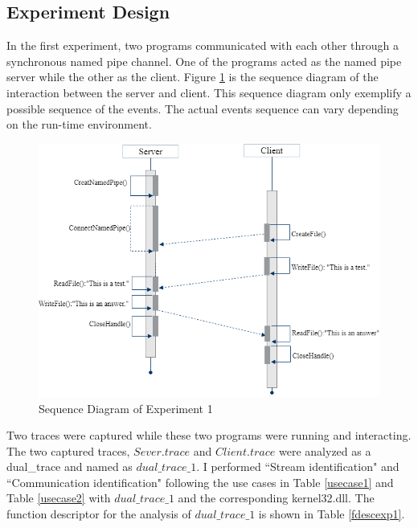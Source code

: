 \subsection{Experiment Design}
In the first experiment, two programs communicated with each other through a synchronous named pipe channel. One of the programs acted as the named pipe server while the other as the client. Figure \ref{exp1} is the sequence diagram of the interaction between the server and client. This sequence diagram only exemplify a possible sequence of the events. The actual events sequence can vary depending on the run-time environment. 


\begin{figure}[H]
\centerline{\includegraphics[scale=0.6]{Figures/exp1}}
 \caption{Sequence Diagram of Experiment 1}
\label{exp1}
\end{figure}

Two traces were captured while these two programs were running and interacting. The two captured traces, $Sever.trace$ and $Client.trace$ were analyzed as a dual\_trace and named as $dual\_trace\_1$. I performed ``Stream identification" and ``Communication identification" following the use cases in Table \ref{usecase1} and Table \ref{usecase2} with $dual\_trace\_1$ and the corresponding kernel32.dll. The function descriptor for the analysis of $dual\_trace\_1$ is shown in Table \ref{fdescexp1}.

